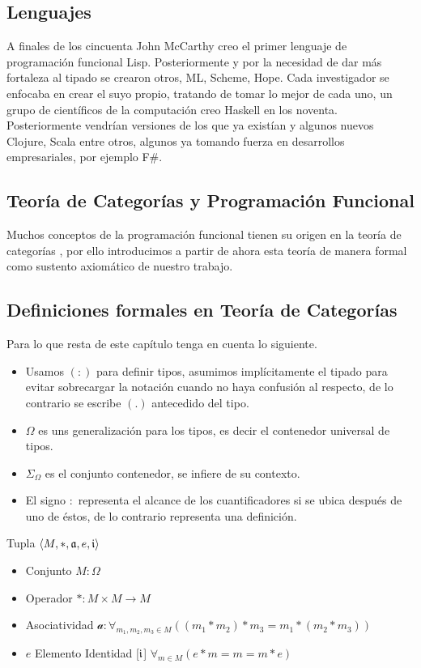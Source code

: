 \subsection{Lenguajes}

A finales de los cincuenta John McCarthy creo el primer lenguaje de programación funcional Lisp. Posteriormente y por la necesidad de dar más fortaleza al tipado se crearon otros, ML, Scheme, Hope. Cada investigador se enfocaba en crear el suyo propio, tratando de tomar lo mejor de cada uno, un grupo de científicos de la computación creo Haskell en los noventa. Posteriormente vendrían versiones de los que ya existían y algunos nuevos Clojure, Scala entre otros, algunos ya tomando fuerza en desarrollos empresariales, por ejemplo F\#.

\subsection{Teoría de Categorías y Programación Funcional}

Muchos conceptos de la programación funcional tienen su origen en la teoría de categorías 
\cite{MacLane1978}, por ello introducimos a partir de ahora esta teoría de manera formal
\cite{Cornell} como sustento axiomático de nuestro trabajo.

\subsection{Definiciones formales en Teoría de Categorías}

Para lo que resta de este capítulo tenga en cuenta lo siguiente.
\begin{itemize}
\item Usamos $(:)$ para definir tipos, asumimos implícitamente el tipado para evitar sobrecargar la notación cuando no haya confusión al respecto, de lo contrario se escribe $(.)$ antecedido del tipo.
\item $\Omega$ es uns generalización para los tipos, es decir el contenedor universal de tipos.
\item $\Sigma_{\Omega}$ es el conjunto contenedor, se infiere de su contexto.
\item El signo $:$ representa el alcance de los cuantificadores si se ubica después de uno de éstos, de lo contrario representa una definición.
\end{itemize}

\begin{defn}[Monoide]
\end{defn}
Tupla $\langle M, *, \mathfrak{a}, e, \mathfrak{i} \rangle$ 
\begin{itemize}
\item Conjunto $M: \Omega$
\item Operador $* : M \times M \to M$
\item Asociatividad $\mathcal{a} : \forall_{m_1, m_2, m_3 \in M} ((m_1 * m_2) * m_3 = m_1 * (m_2 * m_3))$
\item $e$ Elemento Identidad [$\mathfrak{i}$] $\forall_{m \in M} ( e * m = m = m * e)$
\end{itemize}

